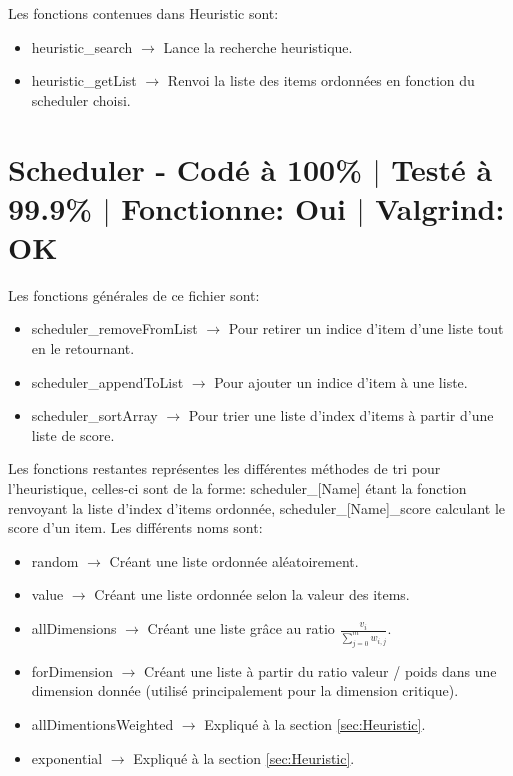 \documentclass{EPUProjetPeiP}
\newcommand{\comp}[5]{
	\section[#1]{#1 {\small - Codé à #2\% $\vert$ Testé à #3\% $\vert$ Fonctionne: #4 $\vert$ Valgrind: #5}}
}
\begin{document}
Les fonctions contenues dans Heuristic sont:
\begin{itemize}
	\item heuristic\_search $\longrightarrow$ Lance la recherche heuristique.
	\item heuristic\_getList $\longrightarrow$ Renvoi la liste des items ordonnées en fonction du scheduler choisi.
\end{itemize}

\comp{Scheduler \label{sec:Scheduler}}{100}{99.9}{Oui}{OK}
Les fonctions générales de ce fichier sont:
\begin{itemize}
	\item scheduler\_removeFromList $\longrightarrow$ Pour retirer un indice d'item d'une liste tout en le retournant.
	\item scheduler\_appendToList $\longrightarrow$ Pour ajouter un indice d'item à une liste.
	\item scheduler\_sortArray $\longrightarrow$ Pour trier une liste d'index d'items à partir d'une liste de score.\\
\end{itemize}

Les fonctions restantes représentes les différentes méthodes de tri pour l'heuristique, celles-ci sont de la forme: scheduler\_[Name] étant la fonction renvoyant la liste d'index d'items ordonnée, scheduler\_[Name]\_score calculant le score d'un item.
Les différents noms sont:
\begin{itemize}
	\item random $\longrightarrow$ Créant une liste ordonnée aléatoirement.
	\item value $\longrightarrow$ Créant une liste ordonnée selon la valeur des items.
	\item allDimensions $\longrightarrow$ Créant une liste grâce au ratio $\frac{v_i}{\sum_{j=0}^mw_{i,j}}$.
	\item forDimension $\longrightarrow$ Créant une liste à partir du ratio valeur / poids dans une dimension donnée (utilisé principalement pour la dimension critique).
	\item allDimentionsWeighted  $\longrightarrow$ Expliqué à la section \ref{sec:Heuristic}.
	\item exponential  $\longrightarrow$ Expliqué à la section \ref{sec:Heuristic}.
\end{itemize}
\end{document}
